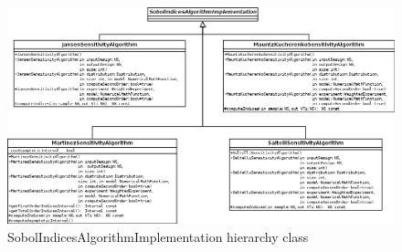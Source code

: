 \begin{figure}[htb]
  \begin{center}
    \includegraphics[scale=0.5]{SobolIndicesAlgorithmImplementation.png}
    \caption{SobolIndicesAlgorithmImplementation hierarchy class}\label{fig:archi:SobolIndicesAlgorithmImplementation}
  \end{center}
\end{figure}


